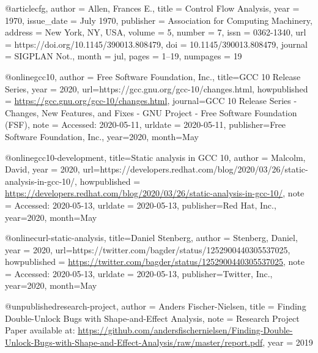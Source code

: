@article{cfg, author = {Allen, Frances E.},
title = {Control Flow Analysis},
year = {1970},
issue_date = {July 1970},
publisher = {Association for Computing Machinery},
address = {New York, NY, USA},
volume = {5},
number = {7},
issn = {0362-1340},
url = {https://doi.org/10.1145/390013.808479},
doi = {10.1145/390013.808479},
journal = {SIGPLAN Not.},
month = jul,
pages = {1–19},
numpages = {19} 
}

@online{gcc10, author = {Free Software Foundation, Inc.},
title={GCC 10 Release Series}, 
year = 2020,
url={https://gcc.gnu.org/gcc-10/changes.html}, 
howpublished = {\url{https://gcc.gnu.org/gcc-10/changes.html}},
journal={GCC 10 Release Series - Changes, New Features, and Fixes - GNU Project - Free Software Foundation (FSF)}, 
note = {Accessed: 2020-05-11},
urldate = {2020-05-11},
publisher={Free Software Foundation, Inc.}, 
year={2020}, 
month={May}
}

@online{gcc10-development, 
title={Static analysis in GCC 10}, 
author = {Malcolm, David},
year = 2020,
url={https://developers.redhat.com/blog/2020/03/26/static-analysis-in-gcc-10/}, 
howpublished = {\url{https://developers.redhat.com/blog/2020/03/26/static-analysis-in-gcc-10/}},
note = {Accessed: 2020-05-13},
urldate = {2020-05-13},
publisher={Red Hat, Inc.}, 
year={2020}, month={May}
}

@online{curl-static-analysis, 
title={Daniel Stenberg}, 
author = {Stenberg, Daniel},
year = 2020,
url={https://twitter.com/bagder/status/1252900440305537025}, 
howpublished = {\url{https://twitter.com/bagder/status/1252900440305537025}},
note = {Accessed: 2020-05-13},
urldate = {2020-05-13},
publisher={Twitter, Inc.}, 
year={2020}, month={May}
}

@unpublished{research-project,
  author = {Anders Fischer-Nielsen},
  title  = {Finding Double-Unlock Bugs with Shape-and-Effect Analysis},
  note   = {Research Project Paper available at: \url{https://github.com/andersfischernielsen/Finding-Double-Unlock-Bugs-with-Shape-and-Effect-Analysis/raw/master/report.pdf}},
  year   = {2019}
}